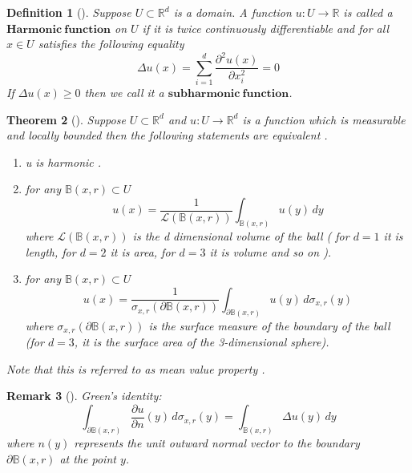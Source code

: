 \documentclass{article}
\numberwithin{equation}{section}
\newtheorem{theorem}{Theorem}[section]
\newtheorem{remark}[theorem]{Remark}
\newtheorem{definition}[theorem]{Definition}
\begin{document}
\begin{definition}[{\cite[Definition 3.1]{PeresMortersBook}}]
Suppose \(U \subset \mathbb{R}^d\) is a domain. A function \(u : U \to \mathbb{R}\) is called a \(\boldsymbol{Harmonic\ function}\) on \(U\) if it is twice continuously differentiable and for all \(x \in U\) satisfies the following equality \\
\[
\Delta u(x) = \sum_{i=1}^{d} \frac{\partial^2 u(x)}{\partial x_i^2} = 0
\]
If \(\Delta{u}(x) \geq 0\) then we call it a \(\boldsymbol{subharmonic\ function}\).
\end{definition}
\begin{theorem}[{\cite[Theorem 3.2]{PeresMortersBook}}]
Suppose \(U \subset \mathbb{R}^d\) and \(u : U \to \mathbb{R}^d\) is a function which is measurable and locally bounded then the following statements are equivalent .
\begin{enumerate}
 \item u is harmonic .
 \item for any \(\mathbb{B}(x,r)\subset U\)
 \[
u(x) = \frac{1}{\mathscr{L}(\mathbb{B}(x, r))} \int_{\mathbb{B}(x, r)} u(y) \, dy
\]
where \(\mathscr{L}(\mathbb{B}(x,r))\) is the d dimensional volume of the ball ( for \(d=1\) it is length, for \(d=2\) it is area, for \(d=3\) it is volume and so on ).
 \item for any \(\mathbb{B}(x,r) \subset U\)
\[
u(x) = \frac{1}{\sigma_{x,r}(\partial \mathbb{B}(x, r))} \int_{\partial \mathbb{B}(x, r)} u(y) \, d\sigma_{x,r}(y)
\]
where \(\sigma_{x,r}(\partial \mathbb{B}(x, r))\) is the surface measure of the boundary of the ball (for \(d = 3\), it is the surface area of the 3-dimensional sphere).
\end{enumerate}
Note that this is referred to as mean value property .
\end{theorem}
\begin{remark}[{\cite[Remark 3.3]{PeresMortersBook}}]
Green's identity:
\[
\int_{\partial \mathbb{B}(x, r)} \frac{\partial u}{\partial n}(y) \, d\sigma_{x,r}(y) = \int_{\mathbb{B}(x, r)} \Delta u(y) \, dy 
\]
where \( n(y) \) represents the unit outward normal vector to the boundary \( \partial \mathbb{B}(x, r) \) at the point \( y \).

\end{remark}
\end{document}
